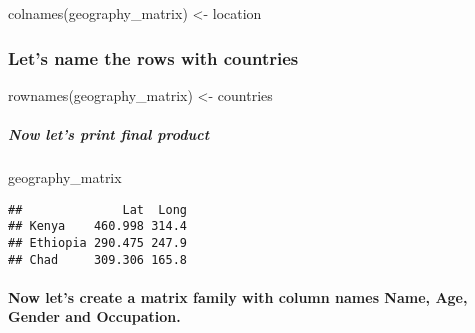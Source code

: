 \documentclass[
]{article}
\newenvironment{Shaded}{\begin{snugshade}}{\end{snugshade}}
\newcommand{\FunctionTok}[1]{\textcolor[rgb]{0.00,0.00,0.00}{#1}}
\newcommand{\NormalTok}[1]{#1}
\newcommand{\OtherTok}[1]{\textcolor[rgb]{0.56,0.35,0.01}{#1}}
\begin{document}
\begin{Shaded}
\begin{Highlighting}[]
\FunctionTok{colnames}\NormalTok{(geography\_matrix) }\OtherTok{\textless{}{-}}\NormalTok{ location}
\end{Highlighting}
\end{Shaded}

\hypertarget{lets-name-the-rows-with-countries}{%
\subsubsection{Let's name the rows with
countries}\label{lets-name-the-rows-with-countries}}

\begin{Shaded}
\begin{Highlighting}[]
\FunctionTok{rownames}\NormalTok{(geography\_matrix) }\OtherTok{\textless{}{-}}\NormalTok{ countries}
\end{Highlighting}
\end{Shaded}

\hypertarget{now-lets-print-final-product}{%
\subparagraph{Now let's print final
product}\label{now-lets-print-final-product}}

\begin{Shaded}
\begin{Highlighting}[]
\NormalTok{geography\_matrix}
\end{Highlighting}
\end{Shaded}

\begin{verbatim}
##              Lat  Long
## Kenya    460.998 314.4
## Ethiopia 290.475 247.9
## Chad     309.306 165.8
\end{verbatim}

\hypertarget{now-lets-create-a-matrix-family-with-column-names-name-age-gender-and-occupation.}{%
\paragraph{Now let's create a matrix family with column names Name, Age,
Gender and
Occupation.}\label{now-lets-create-a-matrix-family-with-column-names-name-age-gender-and-occupation.}}
\end{document}
